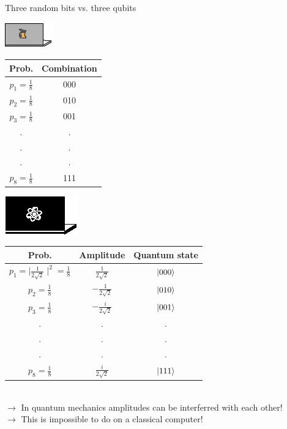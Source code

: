\documentclass[10pt]{beamer}
\begin{document}
{
\begin{frame}[fragile]{Three random bits vs. three qubits}

\begin{minipage}[c]{0.39\textwidth}
\centering
\includegraphics[scale=1.9]{Vectors/laptop_c.eps}\\
\vspace{0.4cm}
\begin{tabular}{c | c}
	Prob. & Combination \\
	\midrule
	$p_1 = \frac{1}{8}$ & 000 \\
	$p_2= \frac{1}{8}$ & 010 \\
	$p_3= \frac{1}{8}$ & 001 \\
	. & .\\
	. & . \\
	. & . \\
	$p_8= \frac{1}{8}$ & 111 \\
	
\end{tabular}
\end{minipage}%
\begin{minipage}[c]{0.59\textwidth}
\centering
\includegraphics[scale=1.2]{Vectors/laptop_q.eps}\\
\vspace{0.5cm}
\begin{tabular}{c | c | c}
	Prob. & Amplitude & Quantum state \\
	\midrule
	$p_1 = \mid\frac{1}{2\sqrt{2}}\mid^2 = \frac{1}{8}$ & $\frac{1}{2\sqrt{2}}$ & $\ket{000}$ \\
	$p_2 =\frac{1}{8}$ & $-\frac{1}{2\sqrt{2}}$ & $\ket{010}$ \\
	$p_3 = \frac{1}{8}$ & $-\frac{i}{2\sqrt{2}}$ & $\ket{001}$ \\
	. & .  & .\\
	. & . & .\\
	. & . & .\\
	$p_8 = \frac{1}{8}$ & $\frac{i}{2\sqrt{2}}$ & $\ket{111}$ \\
	
\end{tabular}
\end{minipage}\\
\vspace{0.5cm}
$\rightarrow$ In quantum mechanics amplitudes can be interferred with each other!\\
$\rightarrow$ This is impossible to do on a classical computer!
\end{frame}
}
\end{document}
